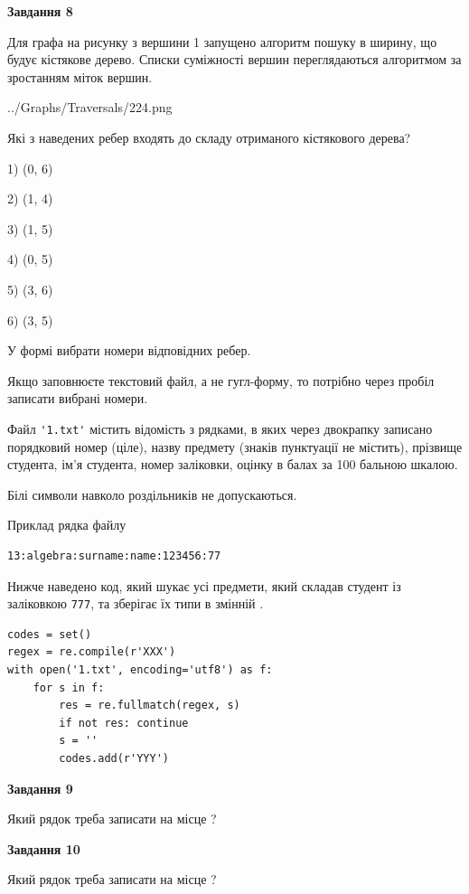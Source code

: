 \documentclass[12pt, ukrainian]{article}
\def\code#1{\Verb!#1!}
\begin{document}
{\begin {large}
{\begin {center}\textbf{Завдання 8}\end {center}}\par
Для графа на рисунку з вершини 1 запущено алгоритм пошуку в ширину, що будує кістякове дерево. Списки суміжності вершин переглядаються алгоритмом за зростанням міток вершин.\par
\begin{center}
	{../Graphs/Traversals/224.png}
\end{center}
\par Які з наведених ребер входять до складу отриманого кістякового дерева?\par
1) (0, 6)\par
2) (1, 4)\par
3) (1, 5)\par
4) (0, 5)\par
5) (3, 6)\par
6) (3, 5)\par
{\vskip 15pt} У формі вибрати номери відповідних ребер.


Якщо заповнюєте текстовий файл, а не гугл-форму, то потрібно через пробіл записа\-ти вибрані номери.\par
\newpage


Файл \code{'1.txt'} містить відомість з рядками, в яких через двокрапку записано поряд\-ковий номер (ціле), назву предмету (знаків пунктуації не містить), прізвище студента, ім'я студента, номер заліковки, оцінку в балах за 100 бальною шкалою.

Білі символи навколо роздільників не допускаються.

Приклад рядка файлу



\begin{verbatim}
13:algebra:surname:name:123456:77
\end{verbatim}


Нижче наведено код, який шукає усі предмети, який складав студент із заліковкою \code{777}, та зберігає їх типи в змінній .



\begin{verbatim}
codes = set()
regex = re.compile(r'XXX')
with open('1.txt', encoding='utf8') as f:
    for s in f:
        res = re.fullmatch(regex, s)
        if not res: continue
        s = ''
        codes.add(r'YYY')
\end{verbatim}


{\begin {center}\textbf{Завдання 9}\end {center}}\par
Який рядок треба записати на місце  ?\par
\vspace{5mm}


{\begin {center}\textbf{Завдання 10}\end {center}}\par
Який рядок треба записати на місце  ?\par


\newpage


\end {large}}
\end{document}
